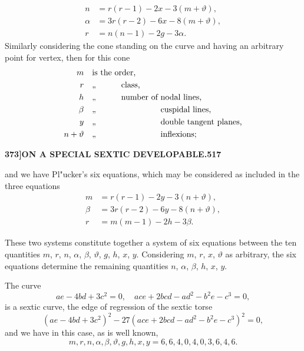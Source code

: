 \documentclass[11pt,a4paper]{article}
\begin{document}
\begin{align*}
n &= r(r - 1) - 2x - 3(m + \vartheta),\\
\alpha &= 3r(r - 2) - 6x - 8(m + \vartheta),\\
r &= n(n - 1) - 2g - 3\alpha.
\end{align*}
Similarly considering the cone standing on the curve and having an arbitrary point for vertex, then for this cone
\begin{align*}
m &\quad \text{is the order,}\\
r &\quad \text{,, \phantom{is the} class,}\\
h &\quad \text{,, \phantom{is the} number of nodal lines,}\\
\beta &\quad \text{,, \phantom{is the number of} cuspidal lines,}\\
y &\quad \text{,, \phantom{is the number of} double tangent planes,}\\
n + \vartheta &\quad \text{,, \phantom{is the number of} inflexions;}
\end{align*}

\newpage
\begin{flushright}
\textbf{373]\hspace{1em}ON A SPECIAL SEXTIC DEVELOPABLE.\hfill517}
\end{flushright}

\vspace{12pt}

\noindent
and we have Pl"{u}cker's six equations, which may be considered as included in the three equations
\begin{align*}
m &= r(r - 1) - 2y - 3(n + \vartheta),\\
\beta &= 3r(r - 2) - 6y - 8(n + \vartheta),\\
r &= m(m - 1) - 2h - 3\beta.
\end{align*}

These two systems constitute together a system of six equations between the ten quantities $m$, $r$, $n$, $\alpha$, $\beta$, $\vartheta$, $g$, $h$, $x$, $y$. Considering $m$, $r$, $x$, $\vartheta$ as arbitrary, the six equations determine the remaining quantities $n$, $\alpha$, $\beta$, $h$, $x$, $y$.

The curve
\[
ae - 4bd + 3c^{2} = 0,\quad ace + 2bcd - ad^{2} - b^{2}e - c^{3} = 0,
\]
is a sextic curve, the edge of regression of the sextic torse
\[
(ae - 4bd + 3c^{2})^{2} - 27(ace + 2bcd - ad^{2} - b^{2}e - c^{3})^{2} = 0,
\]
and we have in this case, as is well known,
\[
m, r, n, \alpha, \beta, \vartheta, g, h, x, y = 6, 6, 4, 0, 4, 0, 3, 6, 4, 6.
\]
\end{document}
